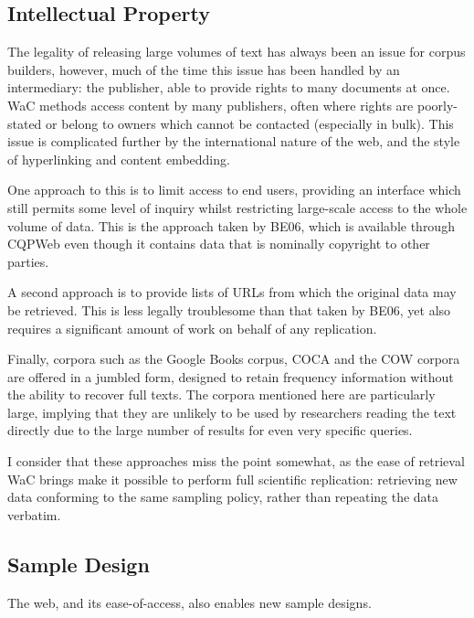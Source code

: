 \subsection{Intellectual Property}
The legality of releasing large volumes of text has always been an issue for corpus builders, however, much of the time this issue has been handled by an intermediary: the publisher, able to provide rights to many documents at once.  WaC methods access content by many publishers, often where rights are poorly-stated or belong to owners which cannot be contacted (especially in bulk).  This issue is complicated further by the international nature of the web, and the style of hyperlinking and content embedding\cite{hemming2010copyright}.  

One approach to this is to limit access to end users, providing an interface which still permits some level of inquiry whilst restricting large-scale access to the whole volume of data.  This is the approach taken by BE06\cite{baker2009be06}, which is available through CQPWeb\cite{hardie2012cqpweb} even though it contains data that is nominally copyright to other parties.

A second approach is to provide lists of URLs from which the original data may be retrieved.  This is less legally troublesome than that taken by BE06, yet also requires a significant amount of work on behalf of any replication.

Finally, corpora such as the Google Books corpus\cite{goldberg2013dataset}, COCA\cite{davies2010corpus} and the COW corpora\cite{schafer8building} are offered in a jumbled form, designed to retain frequency information without the ability to recover full texts.  The corpora mentioned here are particularly large, implying that they are unlikely to be used by researchers reading the text directly due to the large number of results for even very specific queries.


I consider that these approaches miss the point somewhat, as the ease of retrieval WaC brings make it possible to perform full scientific replication: retrieving new data conforming to the same sampling policy, rather than repeating the data verbatim.



\subsection{Sample Design}
The web, and its ease-of-access, also enables new sample designs.

